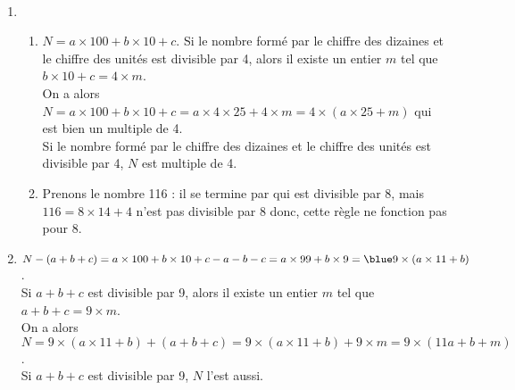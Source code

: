 \ \\ [-5mm]
   \begin{enumerate}
      \item
         \begin{enumerate}
            \item $N =a\times100+b\times10+c$. Si le nombre formé par le chiffre des dizaines et le chiffre des unités est divisible par 4, alors il existe un entier $m$ tel que $b\times10+c =4\times m$. \\
                On a alors $N =a\times100+b\times10+c =a\times4\times25+4\times m =4\times(a\times25+m)$ qui est bien un multiple de 4. \\
                {\blue Si le nombre formé par le chiffre des dizaines et le chiffre des unités est divisible par 4, $N$ est multiple de 4}.
            \item Prenons le nombre 116 : il se termine par  \fg{} qui est divisible par 8, mais $116 =8\times14+4$ n'est pas divisible par 8 donc, {\blue cette règle ne fonction pas pour 8}.
         \end{enumerate}
      \setcounter{enumi}{1}
      \item $N-(a+b+c) =a\times100+b\times10+c-a-b-c =a\times99+b\times9 ={\blue 9\times(a\times11+b)}$. \\
      Si $a+b+c$ est divisible par 9, alors il existe un entier $m$ tel que $a+b+c =9\times m$. \\
      On a alors $N =9\times(a\times11+b)+(a+b+c) =9\times(a\times11+b)+9\times m =9\times(11a+b+m)$. \\
         {\blue Si $a+b+c$ est divisible par 9, $N$ l'est aussi}.
   \end{enumerate}
